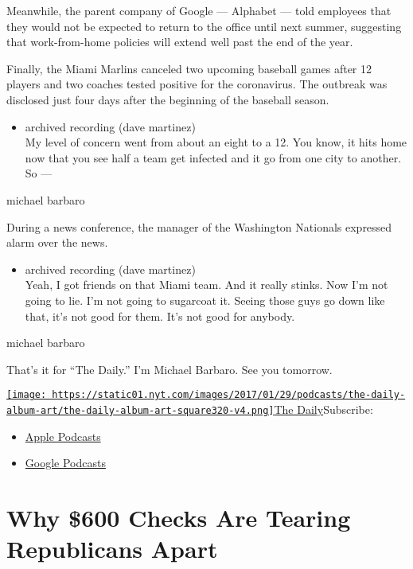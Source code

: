 Meanwhile, the parent company of Google --- Alphabet --- told employees
that they would not be expected to return to the office until next
summer, suggesting that work-from-home policies will extend well past
the end of the year.

Finally, the Miami Marlins canceled two upcoming baseball games after 12
players and two coaches tested positive for the coronavirus. The
outbreak was disclosed just four days after the beginning of the
baseball season.

\begin{itemize}
\tightlist
\item
  archived recording (dave martinez)\\
  My level of concern went from about an eight to a 12. You know, it
  hits home now that you see half a team get infected and it go from one
  city to another. So ---
\end{itemize}

michael barbaro

During a news conference, the manager of the Washington Nationals
expressed alarm over the news.

\begin{itemize}
\tightlist
\item
  archived recording (dave martinez)\\
  Yeah, I got friends on that Miami team. And it really stinks. Now I'm
  not going to lie. I'm not going to sugarcoat it. Seeing those guys go
  down like that, it's not good for them. It's not good for anybody.
\end{itemize}

michael barbaro

That's it for ``The Daily.'' I'm Michael Barbaro. See you tomorrow.

\href{https://www.nytimes.com/column/the-daily}{\texttt{[image: https://static01.nyt.com/images/2017/01/29/podcasts/the-daily-album-art/the-daily-album-art-square320-v4.png]}The
Daily}Subscribe:

\begin{itemize}
\tightlist
\item
  \href{https://itunes.apple.com/us/podcast/id1200361736}{Apple
  Podcasts}
\item
  \href{https://www.google.com/podcasts?feed=aHR0cHM6Ly9yc3MuYXJ0MTkuY29tL3RoZS1kYWlseQ\%3D\%3D}{Google
  Podcasts}
\end{itemize}

\hypertarget{why-600-checks-are-tearing-republicans-apart-1}{%
\section{Why \$600 Checks Are Tearing Republicans
Apart}\label{why-600-checks-are-tearing-republicans-apart-1}}

